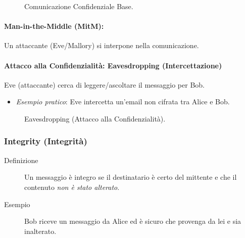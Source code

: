 \begin{figure}[H]
    \centering
    \caption{Comunicazione Confidenziale Base.}
\end{figure}

\paragraph{Man-in-the-Middle (MitM):} Un attaccante (Eve/Mallory) si interpone nella comunicazione.
\paragraph{Attacco alla Confidenzialità: Eavesdropping (Intercettazione)}
Eve (attaccante) cerca di leggere/ascoltare il messaggio per Bob.
\begin{itemize}
    \item \textit{Esempio pratico}: Eve intercetta un'email non cifrata tra Alice e Bob.
\end{itemize}

\begin{figure}[H]
    \centering
    \caption{Eavesdropping (Attacco alla Confidenzialità).}
\end{figure}


\subsubsection{Integrity (Integrità)}
\begin{description}
    \item[Definizione] Un messaggio è integro se il destinatario è certo del mittente e che il contenuto \textit{non è stato alterato}.
    \item[Esempio] Bob riceve un messaggio da Alice ed è sicuro che provenga da lei e sia inalterato.
\end{description}

